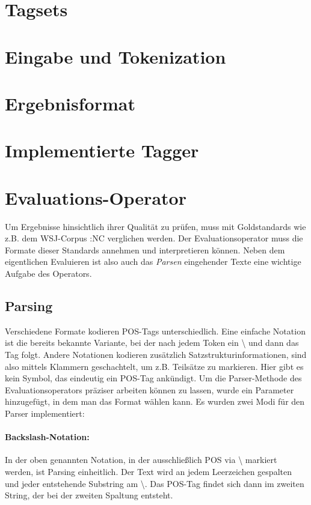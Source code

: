 \section{Tagsets}

\section{Eingabe und Tokenization}

\section{Ergebnisformat}

\section{Implementierte Tagger}

\section{Evaluations-Operator}
\label{sec:impl:eval}
Um Ergebnisse hinsichtlich ihrer Qualität zu prüfen, muss mit Goldstandards wie z.B. dem WSJ-Corpus :NC verglichen werden. Der Evaluationsoperator muss die Formate dieser Standards annehmen und interpretieren können. Neben dem eigentlichen Evaluieren ist also auch das \textit{Parsen} eingehender Texte eine wichtige Aufgabe des Operators. 

\subsection{Parsing}
\label{sec:impl:eval:parsing}
Verschiedene Formate kodieren POS-Tags unterschiedlich. Eine einfache Notation ist die bereits bekannte Variante, bei der nach jedem Token ein \glqq \textbackslash \grqq{} und dann das Tag folgt. Andere Notationen kodieren zusätzlich Satzstrukturinformationen, sind also mittels Klammern geschachtelt, um z.B. Teilsätze zu markieren. Hier gibt es kein Symbol, das eindeutig ein POS-Tag ankündigt. Um die Parser-Methode des Evaluationsoperators präziser arbeiten können zu lassen, wurde ein Parameter hinzugefügt, in dem man das Format wählen kann. Es wurden zwei Modi für den Parser implementiert:

\paragraph{Backslash-Notation:} In der oben genannten Notation, in der ausschließlich POS via \glqq \textbackslash \grqq{} markiert werden, ist Parsing einheitlich. Der Text wird an jedem Leerzeichen gespalten und jeder entstehende Substring am \glqq \textbackslash \grqq{}. Das POS-Tag findet sich dann im zweiten String, der bei der zweiten Spaltung entsteht.

